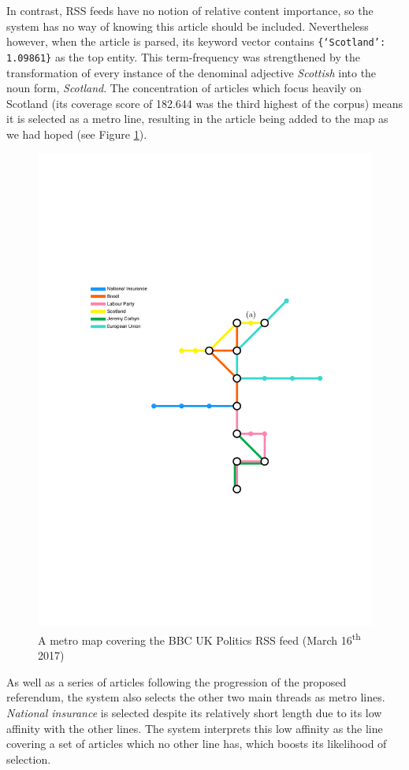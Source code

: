 In contrast, RSS feeds have no notion of relative content importance, so the system has no way of knowing this article should be included. Nevertheless however, when the article is parsed, its keyword vector contains \texttt{\{`Scotland': 1.09861\}} as the top entity. This term-frequency was strengthened by the transformation of every instance of the denominal adjective \textit{Scottish} into the noun form, \textit{Scotland}. The concentration of articles which focus heavily on Scotland (its coverage score of 182.644 was the third highest of the corpus) means it is selected as a metro line, resulting in the article being added to the map as we had hoped (see Figure \ref{fig:bbc-pol}).
\begin{figure}[htbp!]
	\centering
	\includegraphics[width=.9\textwidth]{img/results/bbc-politics.pdf}
	\caption{A metro map covering the BBC UK Politics RSS feed (March 16\textsuperscript{th} 2017)}
	\label{fig:bbc-pol}
\end{figure}

As well as a series of articles following the progression of the proposed referendum, the system also selects the other two main threads as metro lines. \textit{National insurance} is selected despite its relatively short length due to its low affinity with the other lines. The system interprets this low affinity as the line covering a set of articles which no other line has, which boosts its likelihood of selection.


